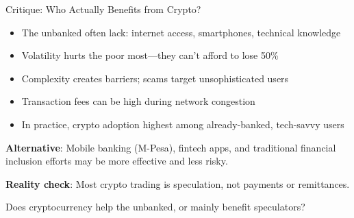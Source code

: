﻿\documentclass[aspectratio=169,11pt]{beamer}
\begin{document}
\begin{frame}[shrink=8]{Critique: Who Actually Benefits from Crypto?}
\begin{objectionbox}
\begin{itemize}
    \item The unbanked often lack: internet access, smartphones, technical knowledge
    \item Volatility hurts the poor most---they can't afford to lose 50\%
    \item Complexity creates barriers; scams target unsophisticated users
    \item Transaction fees can be high during network congestion
    \item In practice, crypto adoption highest among already-banked, tech-savvy users
\end{itemize}
\end{objectionbox}

\vspace{0.3em}
\textbf{Alternative}: Mobile banking (M-Pesa), fintech apps, and traditional financial inclusion efforts may be more effective and less risky.

\textbf{Reality check}: Most crypto trading is speculation, not payments or remittances.

\begin{discussionbox}[Discussion]
Does cryptocurrency help the unbanked, or mainly benefit speculators?
\end{discussionbox}
\end{frame}
\end{document}
